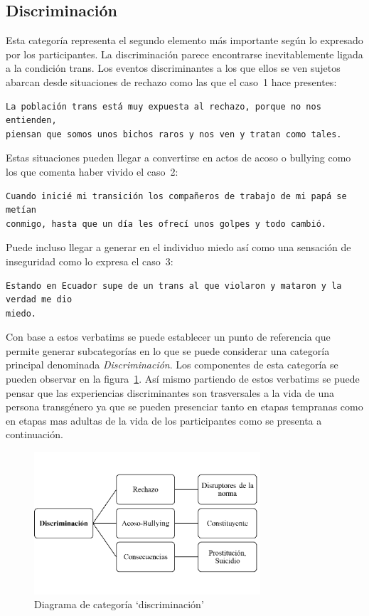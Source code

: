 \subsection{Discriminación}

Esta categoría representa el segundo elemento más importante según lo expresado
por los participantes. La discriminación parece encontrarse inevitablemente
ligada a la condición trans. Los eventos discriminantes a los que ellos se ven
sujetos abarcan desde situaciones de rechazo como las que el caso~1 hace
presentes:

\begin{verbatim}
La población trans está muy expuesta al rechazo, porque no nos entienden,
piensan que somos unos bichos raros y nos ven y tratan como tales.
\end{verbatim}

Estas situaciones pueden llegar a convertirse en actos de acoso o bullying como
los que comenta haber vivido el caso~2:

\begin{verbatim}
Cuando inicié mi transición los compañeros de trabajo de mi papá se metían
conmigo, hasta que un día les ofrecí unos golpes y todo cambió.
\end{verbatim}

 Puede incluso llegar a generar en el individuo miedo así como una sensación de
 inseguridad como lo expresa el caso~3:

 \begin{verbatim}
Estando en Ecuador supe de un trans al que violaron y mataron y la verdad me dio
miedo.
 \end{verbatim}

Con base a estos verbatims se puede establecer un punto de referencia que
permite generar subcategorías en lo que se puede considerar una categoría
principal denominada \emph{Discriminación}. Los componentes de esta categoría se
pueden observar en la figura~\ref{fig:discriminacion}. Así mismo partiendo de
estos verbatims se puede pensar que las experiencias discriminantes son
trasversales a la vida de una persona transgénero ya que se pueden presenciar
tanto en etapas tempranas como en etapas mas adultas de la vida de los
participantes como se presenta a continuación.

\begin{figure}
    \centering
    \includegraphics[width=0.75\textwidth]{discriminacion}
    \caption{Diagrama de categoría ‘discriminación’}\label{fig:discriminacion}
\end{figure}

